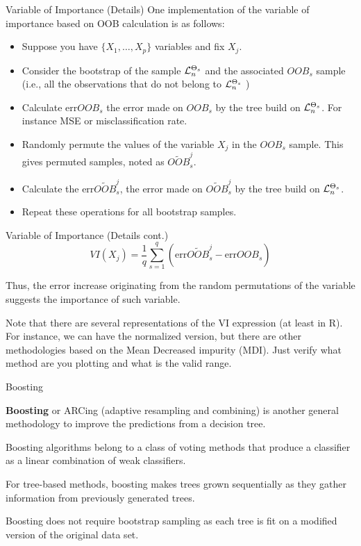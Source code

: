 \documentclass{beamer}
\begin{document}
\begin{frame}{Variable of Importance (Details)}
	One implementation of the variable of importance based on OOB calculation is as follows:
	\begin{itemize}
		\item Suppose you have $\{X_1, \ldots, X_p\}$ variables and fix $X_j$. 
		\item Consider the bootstrap of the sample ${\cal L}_n^{\Theta_s}$ and the associated $OOB_s$ sample (i.e., all the observations that do not belong to ${\cal L}_n^{\Theta_s}$ )
		\item Calculate $\text{err}OOB_s$ the error made on $OOB_s$ by the tree build on ${\cal L}_n^{\Theta_s}$. For instance MSE or misclassification rate.
		\item Randomly permute the values of the variable $X_j$ in the $OOB_s$ sample. This gives permuted samples, noted as $\widetilde{OOB}_s^j$.
		\item Calculate the $\text{err}\widetilde{OOB}_s^j$, the error made on $\widetilde{OOB}_s^j$ by the tree build on ${\cal L}_n^{\Theta_s}$.
		\item Repeat these operations for all bootstrap samples. 
\end{itemize}
		
\end{frame}

\begin{frame}{Variable of Importance (Details cont.)}
	\begin{equation*}
		VI(X_j)= \frac{1}{q} \sum_{s=1}^q (\text{err}\widetilde{OOB}_s^j- \text{err}OOB_s)
	\end{equation*}	

Thus, the error increase originating from the random permutations of the variable suggests the importance of such variable. 

Note that there are several representations of the VI expression (at least in R). For instance, we can have the normalized version, but there are other methodologies based on the Mean Decreased impurity (MDI). Just verify what method are you plotting and what is the valid range. 

\end{frame}
	

\begin{frame}{Boosting}
	
	{\bf Boosting} or ARCing (adaptive resampling and combining) is another general methodology to improve the predictions from a decision tree.
	
	Boosting algorithms belong to a class of voting methods that produce a classifier as a linear combination of weak classifiers.
	 
	For tree-based methods, boosting makes trees grown sequentially as they gather information from previously generated trees. 
	
	
 Boosting does not require bootstrap sampling as each tree is fit on a modified version of the original data set.
 
 
	
\end{frame}
\end{document}
